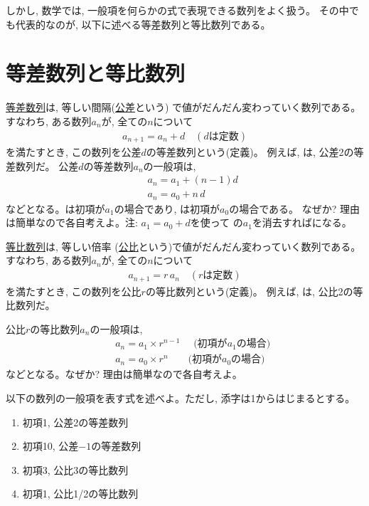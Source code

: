 しかし, 数学では, 一般項を何らかの式で表現できる数列をよく扱う。
その中でも代表的なのが, 以下に述べる等差数列と等比数列である。\\

\section{等差数列と等比数列}
\underline{等差数列}は, 
等しい間隔(\underline{公差}という)
で値がだんだん変わっていく数列である。すなわち, 
ある数列${a_n}$が, 全ての$n$について
\begin{eqnarray}
a_{n+1}=a_n+d\,\,\,\,\,\,(d\text{は定数})\label{eq:stepseries01}
\end{eqnarray}
を満たすとき, この数列を公差$d$の等差数列という(定義)。
例えば, は, 公差2の等差数列だ。
公差$d$の等差数列${a_n}$の一般項は, 
\begin{eqnarray}
&&a_n=a_1+(n-1)d\label{eq:stepseries1}\\
&&a_n=a_0+n\,d\label{eq:stepseries2}
\end{eqnarray}
などとなる。は初項が$a_1$の場合であり, 
は初項が$a_0$の場合である。
なぜか? 理由は簡単なので各自考えよ。注: $a_1=a_0+d$を使って
の$a_1$を消去すればになる。\hv

\underline{等比数列}は, 等しい倍率
(\underline{公比}という)で値がだんだん変わっていく数列である。
すなわち, ある数列${a_n}$が, 全ての$n$について
\begin{eqnarray}
a_{n+1}=r\,a_n\,\,\,\,\,\,(r\text{は定数})\label{eq:touhiseries0}
\end{eqnarray}
を満たすとき, この数列を公比$r$の等比数列という(定義)。
例えば, は, 公比2の等比数列だ。

公比$r$の等比数列${a_n}$の一般項は, 
\begin{eqnarray}
&&a_n=a_1\times r^{n-1}\,\,\,\,\,\,\,\,\text{(初項が$a_1$の場合)}\label{eq:touhiseries1}\\
&&a_n=a_0\times r^n\,\,\,\,\,\,\,\,\,\,\,\,\text{(初項が$a_0$の場合)}\label{eq:touhiseries2}
\end{eqnarray}
などとなる。なぜか? 理由は簡単なので各自考えよ。

\begin{q}\label{q:alg_series0} 以下の数列の一般項を表す式を述べよ。ただし, 添字は1からはじまるとする。
\begin{enumerate}
\item 初項1, 公差2の等差数列
\item 初項10, 公差$-1$の等差数列
\item 初項3, 公比3の等比数列
\item 初項1, 公比1/2の等比数列
\end{enumerate}
\end{q} 


